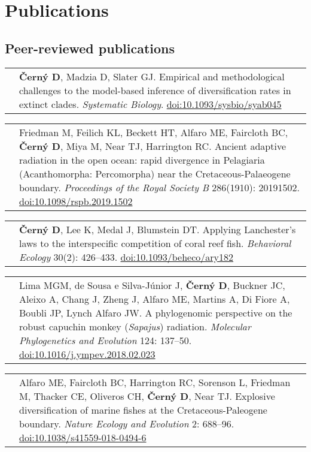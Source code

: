 \documentclass[10pt]{article}
\begin{document}
\section*{Publications}

\subsection*{Peer-reviewed publications}

\begin{tabularx}{\textwidth}{>{\raggedleft\arraybackslash}p{2.2cm} X}
2021 & \textbf{\v{C}ern\'{y} D}, Madzia D, Slater GJ. Empirical and methodological challenges to the model-based inference of diversification rates in extinct clades. \textit{Systematic Biology}. \href{http://doi.org/10.1093/sysbio/syab045}{doi:10.1093/sysbio/syab045}
\end{tabularx}
\begin{tabularx}{\textwidth}{>{\raggedleft\arraybackslash}p{2.2cm} X}
2019 & Friedman M, Feilich KL, Beckett HT, Alfaro ME, Faircloth BC, \textbf{\v{C}ern\'{y} D}, Miya M, Near TJ, Harrington RC. Ancient adaptive radiation in the open ocean: rapid divergence in Pelagiaria (Acanthomorpha: Percomorpha) near the Cretaceous-Palaeogene boundary. \textit{Proceedings of the Royal Society B} 286(1910): 20191502. \href{http://doi.org/10.1098/rspb.2019.1502}{doi:10.1098/rspb.2019.1502}
\end{tabularx}
\begin{tabularx}{\textwidth}{>{\raggedleft\arraybackslash}p{2.2cm} X}
2018 & \textbf{\v{C}ern\'{y} D}, Lee K, Medal J, Blumstein DT. Applying Lanchester's laws to the interspecific competition of coral reef fish. \textit{Behavioral Ecology} 30(2): 426--433. \href{http://doi.org/10.1093/beheco/ary182}{doi:10.1093/beheco/ary182}
\end{tabularx}
\begin{tabularx}{\textwidth}{>{\raggedleft\arraybackslash}p{2.2cm} X}
2018 & Lima MGM, de Sousa e Silva-J\'{u}nior J, \textbf{\v{C}ern\'{y} D}, Buckner JC, Aleixo A, Chang J, Zheng J, Alfaro ME, Martins A, Di Fiore A, Boubli JP, Lynch Alfaro JW. A phylogenomic perspective on the robust capuchin monkey (\textit{Sapajus}) radiation. \textit{Molecular Phylogenetics and Evolution} 124: 137--50. \href{http://doi.org/10.1016/j.ympev.2018.02.023}{doi:10.1016/j.ympev.2018.02.023}
\end{tabularx}
\begin{tabularx}{\textwidth}{>{\raggedleft\arraybackslash}p{2.2cm} X}
2018 & Alfaro ME, Faircloth BC, Harrington RC, Sorenson L, Friedman M, Thacker CE, Oliveros CH, \textbf{\v{C}ern\'{y} D}, Near TJ. Explosive diversification of marine fishes at the Cretaceous-Paleogene boundary. \textit{Nature Ecology and Evolution} 2: 688--96. \href{http://doi.org/10.1038/s41559-018-0494-6}{doi:10.1038/s41559-018-0494-6}
\end{tabularx}
\end{document}
